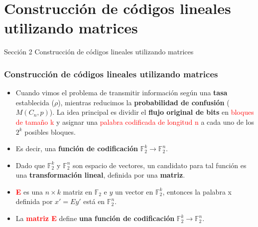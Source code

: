 \documentclass{beamer}
\theoremstyle{plain}
\theoremstyle{example}
\theoremstyle{example}
\begin{document}
\section{Construcción de códigos lineales utilizando matrices}


\begin{frame}   \footnotesize
{
\begin{block}{Sección 2}
Construcción de códigos lineales utilizando matrices
\end{block}
}
\end{frame} 
\begin{frame}  \frametitle{Construcción de códigos lineales utilizando matrices}\small  
\begin{itemize} 

\item Cuando vimos el problema de transmitir información según una \textbf{tasa} establecida ($\rho$), mientras reducimos la \textbf{probabilidad de confusión} ($M(C_n,p)$). La idea principal es dividir el \textbf{flujo original de bits} en \textcolor{red}{bloques de tamaño k} y asignar una \textcolor{red}{palabra codificada de longitud n} a cada uno de los $2^k$ posibles bloques. 

\item Es decir,  una \textbf{función de codificación} $\mathbb{F}_2^k \rightarrow \mathbb{F}_2^n$. 

\item Dado que $\mathbb{F}_2^k$ y $\mathbb{F}_2^n$ son espacio de vectores,  un candidato para tal función es una \textbf{transformación lineal}, definida por una \textbf{matriz}.

\item \textcolor{red}{\textbf{E}} es una $n \times k$ matriz en $\mathbb{F}_2$ e $y$ un vector en  $\mathbb{F}_2^k$, entonces la palabra x definida por $x'=Ey'$ está en $\mathbb{F}_2^n$. 

\item La \textcolor{red}{\textbf{matriz  E}} define \textbf{una función de codificación} $\mathbb{F}_2^k \rightarrow \mathbb{F}_2^n$.

\end{itemize} \end{frame} 
\end{document}
